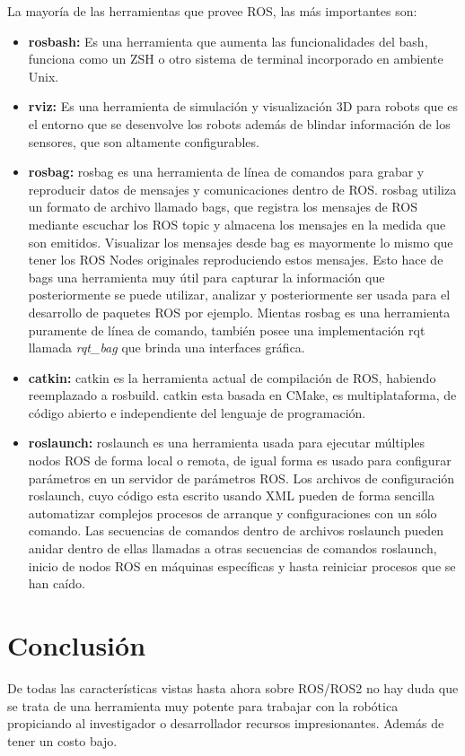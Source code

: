 La mayoría de las herramientas que provee ROS, las más importantes son:
\begin{itemize}
    \item \textbf{rosbash:} Es una herramienta que aumenta las funcionalidades del bash, funciona como un ZSH o otro sistema de terminal incorporado en ambiente Unix.
    \item \textbf{rviz:} Es una herramienta de simulación y visualización 3D para robots que es el entorno que se desenvolve los robots además de blindar información de los sensores, que son altamente configurables.
    \item \textbf{rosbag:} rosbag es una herramienta de línea de comandos para grabar y reproducir datos de mensajes y comunicaciones dentro de ROS. rosbag utiliza un formato de archivo llamado bags, que registra los mensajes de ROS mediante escuchar los ROS topic y almacena los mensajes en la medida que son emitidos. Visualizar los mensajes desde bag es mayormente lo mismo que tener los ROS Nodes originales reproduciendo estos mensajes. Esto hace de bags una herramienta muy útil para capturar la información que posteriormente se puede utilizar, analizar y posteriormente ser usada para el desarrollo de paquetes ROS por ejemplo. Mientas rosbag es una herramienta puramente de línea de comando, también posee una implementación rqt llamada \textit{rqt\_bag} que brinda una interfaces gráfica.
    \item \textbf{catkin:} catkin es la herramienta actual de compilación de ROS, habiendo reemplazado a rosbuild. catkin esta basada en CMake, es multiplataforma, de código abierto e independiente del lenguaje de programación.
    \item \textbf{roslaunch:} roslaunch es una herramienta usada para ejecutar múltiples nodos ROS de forma local o remota, de igual forma es usado para configurar parámetros en un servidor de parámetros ROS. Los archivos de configuración roslaunch, cuyo código esta escrito usando XML pueden de forma sencilla automatizar complejos procesos de arranque y configuraciones con un sólo comando. Las secuencias de comandos dentro de archivos roslaunch pueden anidar dentro de ellas llamadas a otras secuencias de comandos roslaunch, inicio de nodos ROS en máquinas específicas y hasta reiniciar procesos que se han caído.
\end{itemize}

\section{Conclusión}

De todas las características vistas hasta ahora sobre ROS/ROS2 no hay duda que se trata de una herramienta muy potente para trabajar con la robótica propiciando al investigador o desarrollador recursos impresionantes. Además de tener un costo bajo.
